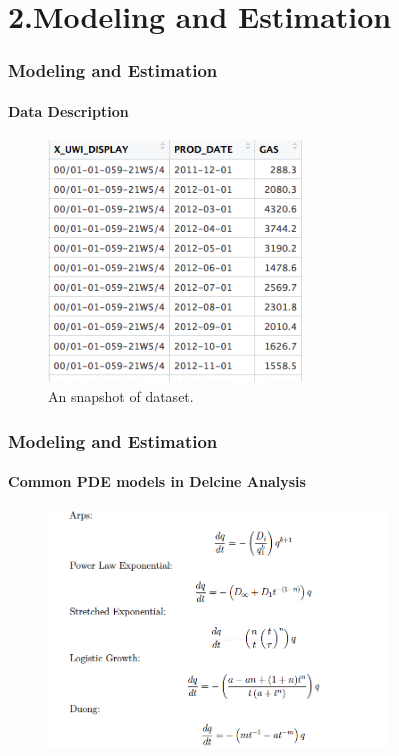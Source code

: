 \documentclass[11pt]{beamer}
\begin{document}
\section{2.Modeling and Estimation}		
	\begin{frame}
		\frametitle{Modeling and Estimation}
		\framesubtitle{Data Description}
		\justifying
	\begin{figure}
\begin{center}
\includegraphics[width=0.6\textwidth  ]{data} 
\caption{An snapshot of dataset. }
\end{center}
\end{figure}	
	\end{frame}		
		
	\begin{frame}
		\frametitle{Modeling and Estimation}
		\framesubtitle{Common PDE models in Delcine Analysis}
		\justifying
\begin{figure}
\begin{center}
\includegraphics[width=0.8\textwidth  ]{model} 
\end{center}
\end{figure}
	\end{frame}		
				
\end{document}
